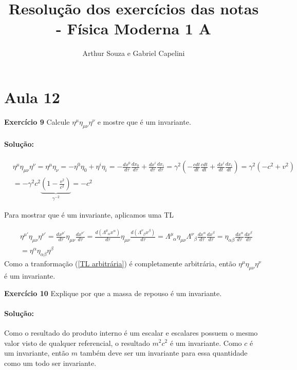 \documentclass[10pt,a4paper]{article}
\title{Resolução dos exercícios das notas - Física Moderna 1 A}
\author{Arthur Souza e Gabriel Capelini}
\begin{document}
\maketitle

\section*{Aula 12}

\textbf{Exercício 9} Calcule $\eta^{\mu}\eta_{\mu \nu}\eta^{\nu}$ e mostre que é um invariante.

\paragraph{Solução:} 
\begin{equation}\label{norma quadrivelocidade}
\begin{split}
&\eta^{\mu}\eta_{\mu \nu}\eta^{\nu} = \eta^{\mu}\eta_{\nu} = -\eta^0 \eta_0 + \eta^i \eta_i = -\frac{dx^0}{d\tau}\frac{dx_0}{d\tau} + \frac{dx^i}{d\tau}\frac{dx_i}{d\tau} = \gamma^2 \left(-\frac{cdt}{dt}\frac{cdt}{dt} + \frac{dx^i}{dt}\frac{dx_i}{dt}\right) = \gamma^2(-c^2+v^2)\\
& = -\gamma^2 c^2\underbrace{\left(1 - \frac{v^2}{c^2}\right)}_{\gamma^{-2}} = -c^2
\end{split}
\end{equation}

Para mostrar que é um invariante, aplicamos uma TL


\begin{equation}\label{TL arbitrária}
\begin{split}
&\eta^{\mu'}\eta_{\mu \nu}\eta^{\nu'} = \frac{dx^{\mu'}}{d\tau}\eta_{\mu \nu}\frac{dx^{\nu'}}{d\tau} = \frac{d(\Lambda^{\mu}_{\;\;\alpha}x^{\alpha})}{d\tau}\eta_{\mu \nu}\frac{d(\Lambda^{\nu}_{\;\;\beta}x^{\beta})}{d\tau} = \Lambda^{\mu}_{\;\;\alpha}\eta_{\mu \nu}\Lambda^{\nu}_{\;\;\beta}\frac{dx^{\alpha}}{d\tau}\frac{dx^{\beta}}{d\tau} = \eta_{\alpha \beta}\frac{dx^{\alpha}}{d\tau}\frac{dx^{\beta}}{d\tau}\\
& = \eta^{\alpha}\eta_{\alpha \beta}\eta^{\beta}
\end{split} 
\end{equation}
Como a tranformação (\ref{TL arbitrária}) é completamente arbitrária, então $\eta^{\mu}\eta_{\mu \nu}\eta^{\nu}$ é um invariante.


\noindent \textbf{Exercício 10} Explique por que a massa de repouso é um invariante.

\paragraph{Solução:}  Como o resultado do produto interno é um escalar e escalares possuem o mesmo valor visto de qualquer referencial, o resultado $m^2c^2$ é um invariante. Como $c$ é um invariante, então $m$ também deve ser um invariante para essa quantidade como um todo ser invariante. 
\end{document}
